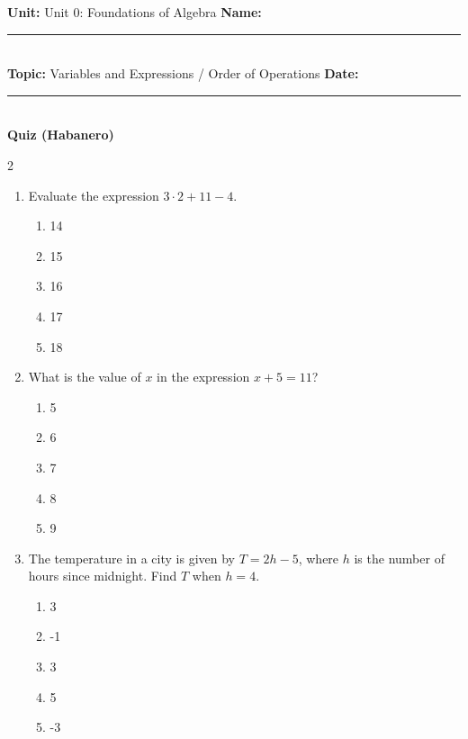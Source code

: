 \documentclass[10pt]{article}
\begin{document}
\enlargethispage{2.5cm}

\begin{tcolorbox}[colback=mainblue!5, colframe=mainblue, sharp corners, boxrule=0.5pt]
    \small \textbf{Unit:} Unit 0: Foundations of Algebra \hfill \textbf{Name:} \rule{3cm}{0.4pt} \\
    \small \textbf{Topic:} Variables and Expressions / Order of Operations \hfill \textbf{Date:} \rule{2cm}{0.4pt} \\
    \centering \textbf{\large Quiz (Habanero)}
\end{tcolorbox}

\vspace{0.2cm}

\begin{multicols}{2}
\begin{enumerate}[label=\textbf{Q\arabic*.}, leftmargin=*, itemsep=6pt, parsep=0pt]

  \item \small Evaluate the expression $3 \cdot 2 + 11 - 4$.
  \begin{enumerate}[label=(\Alph*), leftmargin=0.6cm, nosep, itemsep=2pt]
    \item 14
    \item 15
    \item 16
    \item 17
    \item 18
  \end{enumerate}

  \item \small What is the value of $x$ in the expression $x + 5 = 11$?
  \begin{enumerate}[label=(\Alph*), leftmargin=0.6cm, nosep, itemsep=2pt]
    \item 5
    \item 6
    \item 7
    \item 8
    \item 9
  \end{enumerate}

  \item \small The temperature in a city is given by $T = 2h - 5$, where $h$ is the number of hours since midnight. Find $T$ when $h = 4$.
  \begin{enumerate}[label=(\Alph*), leftmargin=0.6cm, nosep, itemsep=2pt]
    \item 3
    \item -1
    \item 3
    \item 5
    \item -3
  \end{enumerate}


\end{enumerate}
\end{multicols}
\end{document}
